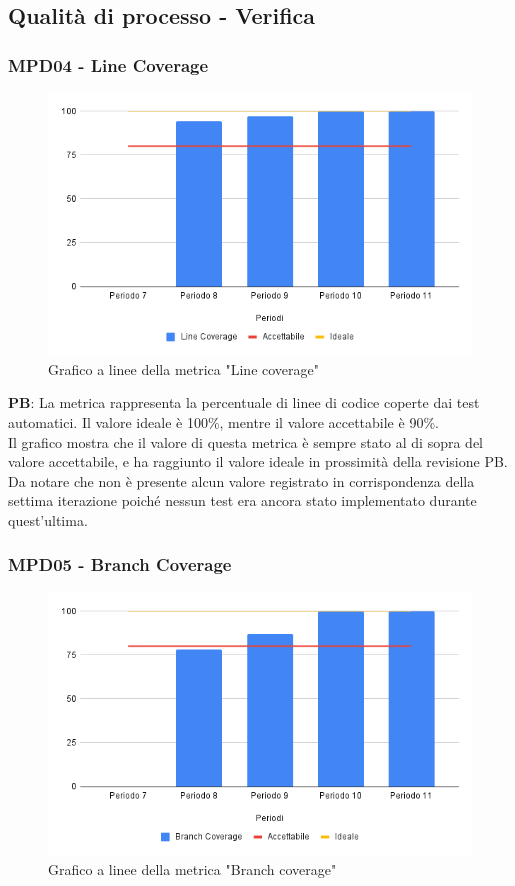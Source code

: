 \documentclass[10pt]{article}
\begin{document}
\begin{justify}
\subsection{Qualità di processo - Verifica}
\subsubsection{MPD04 - Line Coverage}

\begin{figure}[H]
  \centering
  \includegraphics[width=0.9\linewidth]{LineCoverage.png}
  \caption{Grafico a linee della metrica "Line coverage"}
\end{figure}

\textbf{PB}: La metrica rappresenta la percentuale di linee di codice coperte dai test automatici. Il valore ideale è 100\%, mentre il valore accettabile è 90\%.\\
Il grafico mostra che il valore di questa metrica è sempre stato al di sopra del valore accettabile, e ha raggiunto il valore ideale in prossimità della revisione PB.\\
Da notare che non è presente alcun valore registrato in corrispondenza della settima iterazione poiché nessun test era ancora stato implementato durante quest'ultima.\\


\subsubsection{MPD05 - Branch Coverage}

\begin{figure}[H]
  \centering
  \includegraphics[width=0.9\linewidth]{BranchCoverage.png}
  \caption{Grafico a linee della metrica "Branch coverage"}
\end{figure}


\end{justify}
\end{document}

